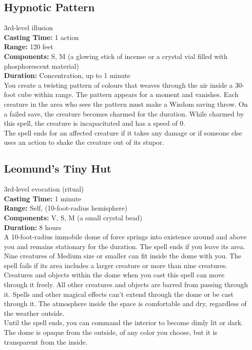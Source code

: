 \documentclass[11pt, A4paper, english]{article}
\begin{document}
		\subsection{Hypnotic Pattern}
3rd-level illusion \\
\textbf{Casting Time:} 1 action \\
\textbf{Range:} 120 feet \\
\textbf{Components:} S, M (a glowing stick of incense or a crystal vial filled with phosphorescent material) \\
\textbf{Duration:} Concentration, up to 1 minute \\
You create a twisting pattern of colours that weaves through the air inside a 30-foot cube within range. The pattern appears for a moment and vanishes. Each creature in the area who sees the pattern must make a Wisdom saving throw. On a failed save, the creature becomes charmed for the duration. While charmed by this spell, the creature is incapacitated and has a speed of 0. \\
The spell ends for an affected creature if it takes any damage or if someone else uses an action to shake the creature out of its stupor.

		\subsection{Leomund’s Tiny Hut}
3rd-level evocation (ritual) \\
\textbf{Casting Time:} 1 minute \\
\textbf{Range:} Self, (10-foot-radius hemisphere) \\
\textbf{Components:} V, S, M (a small crystal bead) \\
\textbf{Duration:} 8 hours \\
A 10-foot-radius immobile dome of force springs into existence around and above you and remains stationary for the duration. The spell ends if you leave its area. \\
Nine creatures of Medium size or smaller can fit inside the dome with you. The spell fails if its area includes a larger creature or more than nine creatures. Creatures and objects within the dome when you cast this spell can move through it freely. All other creatures and objects are barred from passing through it. Spells and other magical effects can’t extend through the dome or be cast through it. The atmosphere inside the space is comfortable and dry, regardless of the weather outside. \\
Until the spell ends, you can command the interior to become dimly lit or dark. The dome is opaque from the outside, of any color you choose, but it is transparent from the inside.
\end{document}
